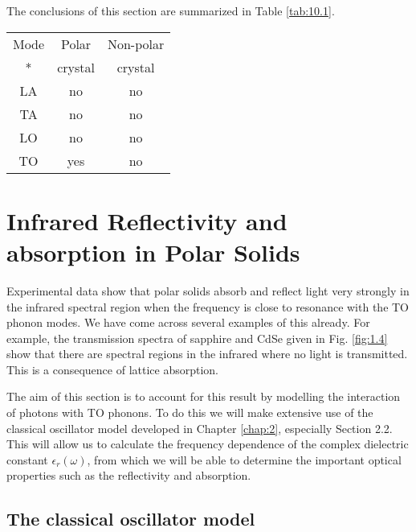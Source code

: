 \documentclass[12pt]{book}
\begin{document}
The conclusions of this section are summarized in Table \ref{tab:10.1}.

\begin{table}
  \centering
  \begin{tabular}{ccc}

     Mode & Polar & Non-polar \\
     * & crystal & crystal \\
     LA & no & no \\
     TA & no & no \\
     LO & no & no \\
     TO & yes & no \\

   \end{tabular}
\end{table}


\section{Infrared Reflectivity and absorption in Polar Solids}

Experimental data show that polar solids absorb and reflect light very strongly in the infrared spectral region when the frequency is close to resonance with the TO phonon modes. We have come across several examples of this already. For example, the transmission spectra of sapphire and CdSe given in Fig. \ref{fig:1.4} show that there are spectral regions in the infrared where no light is transmitted. This is a consequence of lattice absorption.

The aim of this section is to account for this result by modelling the interaction of photons with TO phonons. To do this we will make extensive use of the classical oscillator model developed in Chapter \ref{chap:2}, especially Section 2.2. This will allow us to calculate the frequency dependence of the complex dielectric constant $\epsilon_r(\omega)$, from which we will be able to determine the important optical properties such as the reflectivity and absorption.

\subsection{The classical oscillator model}
\end{document}
